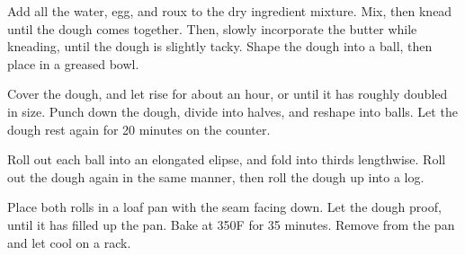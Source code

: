 \documentclass[11pt]{article}
\begin{document}
Add all the water, egg, and roux to the dry ingredient
mixture. Mix, then knead until the dough comes together. Then,
slowly incorporate the butter while kneading, until the dough is
slightly tacky. Shape the dough into a ball, then place in a
greased bowl.

Cover the dough, and let rise for about an hour, or until it has
roughly doubled in size. Punch down the dough, divide into halves,
and reshape into balls. Let the dough rest again for 20 minutes on
the counter.

Roll out each ball into an elongated elipse, and fold into thirds lengthwise.
Roll out the dough again in the same manner, then roll the dough
up into a log.

Place both rolls in a loaf pan with the seam facing down. Let
the dough proof, until it has filled up the pan. Bake at 350F for
35 minutes. Remove from the pan and let cool on a rack.
\end{document}
